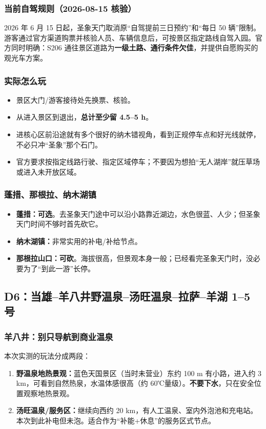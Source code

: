 \documentclass[10.5pt,a4paper]{ctexart}
\newcommand{\tagopt}{\textcolor{blue!70!black}{\textbf{可选}}}
\newcommand{\tagcut}{\textcolor{red!70!black}{\textbf{可砍}}}
\begin{document}
\subsubsection{当前自驾规则（2026-08-15 核验）}
2026 年 6 月 15 日起，圣象天门取消原“自驾提前三日预约”和“每日 50 辆”限制。游客通过官方渠道购票并核验人员、车辆信息后，可按景区指定路线自驾入园。官方同时明确：S206 通往景区道路为\textbf{一级土路、通行条件欠佳}，并提供自愿购买的观光车方案。

\subsubsection{实际怎么玩}
\begin{itemize}
  \item 景区大门/游客接待处先换票、核验。
  \item 从进入景区到退出，\textbf{总计至少留 4.5--5 h}。
  \item 进核心区前沿途就有多个很好的纳木错视角，看到正规停车点和好光线就停，不必只冲“圣象”那个石门。
  \item 官方要求按指定线路行驶、指定区域停车；不要因为想拍“无人湖岸”就压草场或进入未开放区域。
\end{itemize}

\subsubsection{蓬措、那根拉、纳木湖镇}
\begin{itemize}
  \item \textbf{蓬措：}\tagopt。去圣象天门途中可以沿小路靠近湖边，水色很蓝、人少；但圣象天门时间不够时首先砍它。
  \item \textbf{纳木湖镇：}非常实用的补电/补给节点。
  \item \textbf{那根拉山口：}\tagcut。海拔很高，但景观本身一般；已经看完圣象天门时，没必要为了“到此一游”长停。
\end{itemize}

\subsection{D6：当雄--羊八井野温泉--汤旺温泉--拉萨--羊湖 1--5 号}

\subsubsection{羊八井：别只导航到商业温泉}
本次实测的玩法分成两段：
\begin{enumerate}
  \item \textbf{野温泉地热景观：}蓝色天国景区（当时未营业）东约 100 m 有小路，进入约 3 km，可看到自然热泉，水温体感很高（约 60℃量级）。\textbf{不要下水}，只在安全位置观察地热景观。
  \item \textbf{汤旺温泉/服务区：}继续向西约 20 km，有人工温泉、室内外泡池和充电站。本次到此补电但未泡。适合作为“补能+休息”的服务区式节点。
\end{enumerate}
\end{document}
